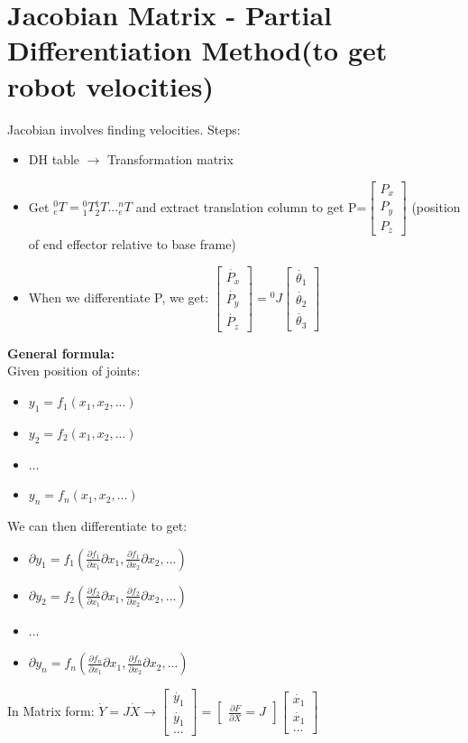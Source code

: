 \documentclass{article}
\begin{document}
\section{Jacobian Matrix - Partial Differentiation Method(to get robot velocities)}
Jacobian involves finding velocities. Steps:
\begin{itemize}
    \item DH table $\rightarrow$ Transformation matrix
    \item Get ${}^0_eT={}^0_1T {}^1_2T ... {}^n_eT$ and extract translation column to get P=$\begin{bmatrix}
        P_x\\
        P_y\\
        P_z
    \end{bmatrix}$ (position of end effector relative to base frame)
    \item When we differentiate P, we get: $\begin{bmatrix}
        \dot{P_x}\\
        \dot{P_y}\\
        \dot{P_z}
    \end{bmatrix}= {}^0J \begin{bmatrix}
        \dot{\theta_1} \\
        \dot{\theta_2} \\
        \dot{\theta_3}
    \end{bmatrix}$
\end{itemize}
\textbf{General formula:}\\
Given position of joints:
\begin{itemize}
    \item $y_1=f_1(x_1,x_2,...)$
    \item $y_2=f_2(x_1,x_2,...)$
    \item ...
    \item $y_n=f_n(x_1,x_2,...)$
\end{itemize}
We can then differentiate to get:
\begin{itemize}
    \item $\partial y_1=f_1(\frac{\partial f_1}{\partial x_1}\partial x_1,\frac{\partial f_1}{\partial x_2}\partial x_2,...)$
    \item $\partial y_2=f_2(\frac{\partial f_2}{\partial x_1}\partial x_1,\frac{\partial f_2}{\partial x_2}\partial x_2,...)$
    \item ...
    \item $\partial y_n=f_n(\frac{\partial f_n}{\partial x_1}\partial x_1,\frac{\partial f_n}{\partial x_2}\partial x_2,...)$
\end{itemize}
In Matrix form:
$\dot{Y}=J\dot{X} \rightarrow \begin{bmatrix}
    \dot{y_1}\\
    \dot{y_1}\\
    ...
\end{bmatrix}=
\begin{bmatrix}
    \frac{\partial F}{\partial X} = J 
\end{bmatrix}\begin{bmatrix}
    \dot{x_1}\\
    \dot{x_1}\\
    ...
\end{bmatrix}$
\end{document}
